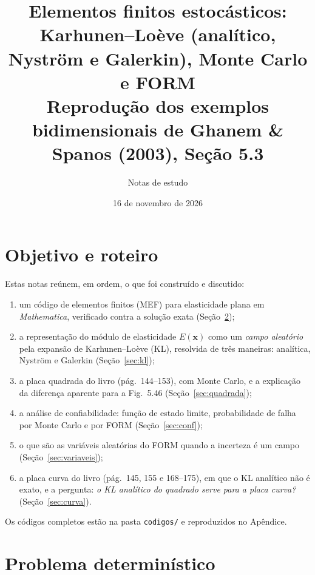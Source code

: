 \documentclass[11pt,a4paper]{article}
\title{Elementos finitos estocásticos:\\
Karhunen--Loève (analítico, Nyström e Galerkin), Monte Carlo e FORM\\[2mm]
\large Reprodução dos exemplos bidimensionais de Ghanem \& Spanos (2003), Seção 5.3}
\author{Notas de estudo}
\date{16 de novembro de 2026}
\newcommand{\bx}{\bm{x}}
\begin{document}
\maketitle
\tableofcontents
\newpage

\section{Objetivo e roteiro}
Estas notas reúnem, em ordem, o que foi construído e discutido:
\begin{enumerate}
  \item um código de elementos finitos (MEF) para elasticidade plana em \emph{Mathematica}, verificado contra a solução exata (Seção~\ref{sec:det});
  \item a representação do módulo de elasticidade $E(\bx)$ como um \emph{campo aleatório} pela expansão de Karhunen--Loève (KL), resolvida de três maneiras: analítica, Nyström e Galerkin (Seção~\ref{sec:kl});
  \item a placa quadrada do livro (pág.~144--153), com Monte Carlo, e a explicação da diferença aparente para a Fig.~5.46 (Seção~\ref{sec:quadrada});
  \item a análise de confiabilidade: função de estado limite, probabilidade de falha por Monte Carlo e por FORM (Seção~\ref{sec:conf});
  \item o que são as variáveis aleatórias do FORM quando a incerteza é um campo (Seção~\ref{sec:variaveis});
  \item a placa curva do livro (pág.~145, 155 e 168--175), em que o KL analítico não é exato, e a pergunta: \emph{o KL analítico do quadrado serve para a placa curva?} (Seção~\ref{sec:curva}).
\end{enumerate}
Os códigos completos estão na pasta \texttt{codigos/} e reproduzidos no Apêndice.

\section{Problema determinístico}\label{sec:det}
\end{document}
